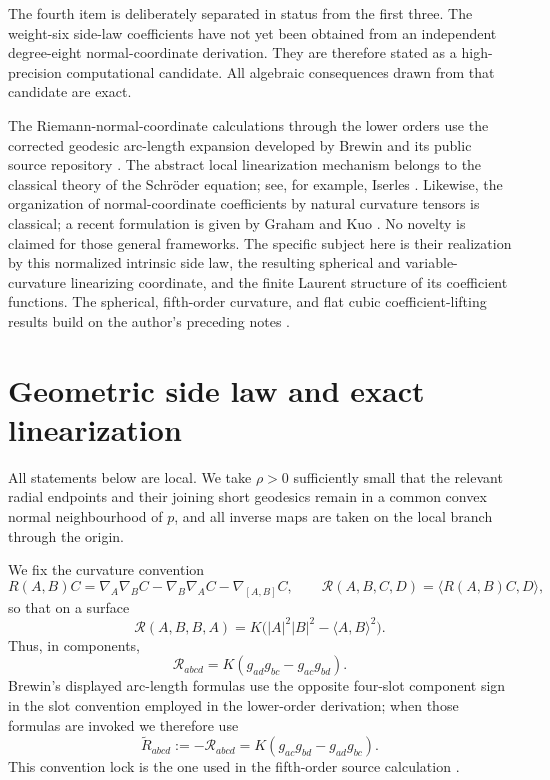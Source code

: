 \documentclass[11pt]{article}
\theoremstyle{definition}
\theoremstyle{remark}
\newcommand{\Riem}{\mathcal{R}}
\newcommand{\BRiem}{\widetilde{R}}
\begin{document}
The fourth item is deliberately separated in status from the first three.
The weight-six side-law coefficients have not yet been obtained from an
independent degree-eight normal-coordinate derivation.  They are therefore
stated as a high-precision computational candidate.  All algebraic consequences
drawn from that candidate are exact.

The Riemann-normal-coordinate calculations through the lower orders use the
corrected geodesic arc-length expansion developed by Brewin and its public
source repository \cite{Brewin2009,BrewinRepository}.  The abstract local
linearization mechanism belongs to the classical theory of the Schr\"oder
equation; see, for example, Iserles \cite{Iserles1993}.  Likewise, the
organization of normal-coordinate coefficients by natural curvature tensors
is classical; a recent formulation is given by Graham and Kuo
\cite{GrahamKuo2026}.  No novelty is claimed for those general frameworks.
The specific subject here is their realization by this normalized intrinsic
side law, the resulting spherical and variable-curvature linearizing
coordinate, and the finite Laurent structure of its coefficient functions.
The spherical, fifth-order curvature, and flat cubic coefficient-lifting
results build on the author's preceding notes \cite{BakerSphere,BakerCurvature,BakerNSeries}.

\section{Geometric side law and exact linearization}
\label{sec:side-law}

All statements below are local.  We take \(\rho>0\) sufficiently small that
the relevant radial endpoints and their joining short geodesics remain in a
common convex normal neighbourhood of \(p\), and all inverse maps are taken on
the local branch through the origin.

We fix the curvature convention
\[
R(A,B)C
=\nabla_A\nabla_BC-\nabla_B\nabla_AC-\nabla_{[A,B]}C,
\qquad
\Riem(A,B,C,D)=\langle R(A,B)C,D\rangle,
\]
so that on a surface
\[
\Riem(A,B,B,A)
=K\bigl(|A|^2|B|^2-\langle A,B\rangle^2\bigr).
\]
Thus, in components,
\[
\Riem_{abcd}=K(g_{ad}g_{bc}-g_{ac}g_{bd}).
\]
Brewin's displayed arc-length formulas use the opposite four-slot component
sign in the slot convention employed in the lower-order derivation; when
those formulas are invoked we therefore use
\[
\BRiem_{abcd}:=-\Riem_{abcd}
=K(g_{ac}g_{bd}-g_{ad}g_{bc}).
\]
This convention lock is the one used in the fifth-order source calculation
\cite{BakerCurvature}.
\end{document}
